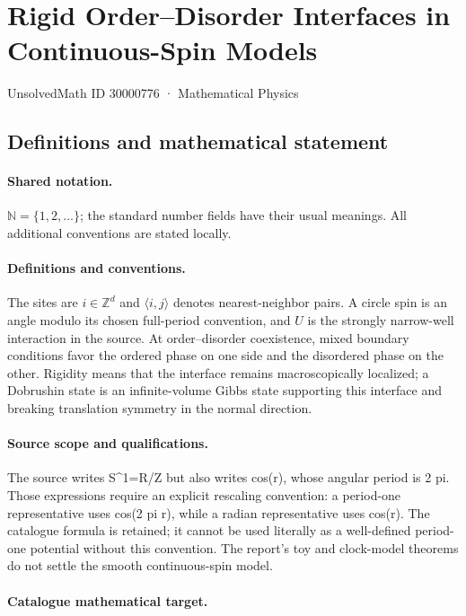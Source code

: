 \documentclass[11pt]{article}
\begin{document}
\setcounter{section}{30000775}
\section{Rigid Order–Disorder Interfaces in Continuous-Spin Models}\label{30000776}
{\small UnsolvedMath ID 30000776 · Mathematical Physics}
\subsection{Definitions and mathematical statement}

\paragraph{Shared notation.}$\mathbb N=\{1,2,\ldots\}$; the standard number fields have their usual meanings. All additional conventions are stated locally.


\paragraph{Definitions and conventions.} The sites are $i\in\mathbb Z^d$ and $\langle i,j\rangle$ denotes nearest-neighbor pairs. A circle spin is an angle modulo its chosen full-period convention, and $U$ is the strongly narrow-well interaction in the source. At order--disorder coexistence, mixed boundary conditions favor the ordered phase on one side and the disordered phase on the other. Rigidity means that the interface remains macroscopically localized; a Dobrushin state is an infinite-volume Gibbs state supporting this interface and breaking translation symmetry in the normal direction.

\paragraph{Source scope and qualifications.} The source writes S^1=R/Z but also writes cos(r), whose angular period is 2 pi. Those expressions require an explicit rescaling convention: a period-one representative uses cos(2 pi r), while a radian representative uses cos(r). The catalogue formula is retained; it cannot be used literally as a well-defined period-one potential without this convention. The report's toy and clock-model theorems do not settle the smooth continuous-spin model.

\paragraph{Catalogue mathematical target.}
\end{document}
